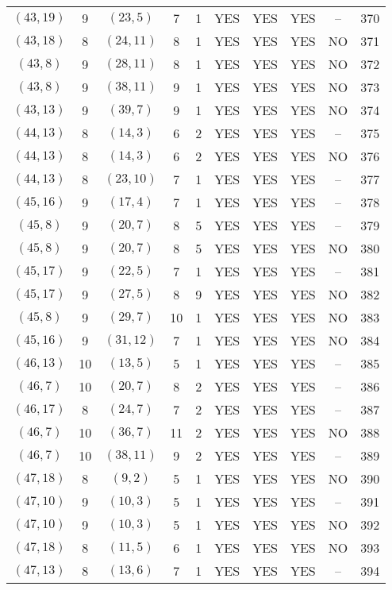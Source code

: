 \begin{longtable}{|c|c|c|c|c|c|c|c|c|c|}
$(43, 19)$ & 9 & $(23, 5)$ & 7 & 1 & YES & YES & YES & -- & 370\\
$(43, 18)$ & 8 & $(24, 11)$ & 8 & 1 & YES & YES & YES & NO & 371\\
$(43, 8)$ & 9 & $(28, 11)$ & 8 & 1 & YES & YES & YES & NO & 372\\
$(43, 8)$ & 9 & $(38, 11)$ & 9 & 1 & YES & YES & YES & NO & 373\\
$(43, 13)$ & 9 & $(39, 7)$ & 9 & 1 & YES & YES & YES & NO & 374\\
$(44, 13)$ & 8 & $(14, 3)$ & 6 & 2 & YES & YES & YES & -- & 375\\
$(44, 13)$ & 8 & $(14, 3)$ & 6 & 2 & YES & YES & YES & NO & 376\\
$(44, 13)$ & 8 & $(23, 10)$ & 7 & 1 & YES & YES & YES & -- & 377\\
$(45, 16)$ & 9 & $(17, 4)$ & 7 & 1 & YES & YES & YES & -- & 378\\
$(45, 8)$ & 9 & $(20, 7)$ & 8 & 5 & YES & YES & YES & -- & 379\\
$(45, 8)$ & 9 & $(20, 7)$ & 8 & 5 & YES & YES & YES & NO & 380\\
$(45, 17)$ & 9 & $(22, 5)$ & 7 & 1 & YES & YES & YES & -- & 381\\
$(45, 17)$ & 9 & $(27, 5)$ & 8 & 9 & YES & YES & YES & NO & 382\\
$(45, 8)$ & 9 & $(29, 7)$ & 10 & 1 & YES & YES & YES & NO & 383\\
$(45, 16)$ & 9 & $(31, 12)$ & 7 & 1 & YES & YES & YES & NO & 384\\
$(46, 13)$ & 10 & $(13, 5)$ & 5 & 1 & YES & YES & YES & -- & 385\\
$(46, 7)$ & 10 & $(20, 7)$ & 8 & 2 & YES & YES & YES & -- & 386\\
$(46, 17)$ & 8 & $(24, 7)$ & 7 & 2 & YES & YES & YES & -- & 387\\
$(46, 7)$ & 10 & $(36, 7)$ & 11 & 2 & YES & YES & YES & NO & 388\\
$(46, 7)$ & 10 & $(38, 11)$ & 9 & 2 & YES & YES & YES & -- & 389\\
$(47, 18)$ & 8 & $(9, 2)$ & 5 & 1 & YES & YES & YES & NO & 390\\
$(47, 10)$ & 9 & $(10, 3)$ & 5 & 1 & YES & YES & YES & -- & 391\\
$(47, 10)$ & 9 & $(10, 3)$ & 5 & 1 & YES & YES & YES & NO & 392\\
$(47, 18)$ & 8 & $(11, 5)$ & 6 & 1 & YES & YES & YES & NO & 393\\
$(47, 13)$ & 8 & $(13, 6)$ & 7 & 1 & YES & YES & YES & -- & 394\\

\end{longtable}
